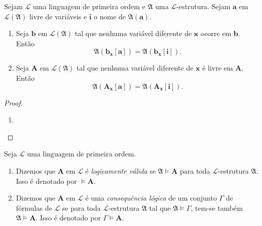 \begin{lemma}
    Sejam $\mathcal{L}$ uma linguagem de primeira ordem e $\mathfrak{A}$ uma $\mathcal{L}$-estrutura. Sejam $\mathbf{a}$ em $\mathcal{L}(\mathfrak{A})$ livre de variáveis e $\mathbf{i}$ o nome de $\mathfrak{A}(\mathbf{a})$.
        \begin{enumerate}[leftmargin=*, align=left, label=\textbf{(\alph*)}]
            \item Seja $\mathbf{b}$ em $\mathcal{L}(\mathfrak{A})$ tal que nenhuma variável diferente de $\mathbf{x}$ ocorre em $\mathbf{b}$. Então
                \[
                    \mathfrak{A}(\mathbf{b}_{\mathbf{x}}[\mathbf{a}]) = \mathfrak{A}(\mathbf{b}_{\mathbf{x}}[\mathbf{i}]).
                \]
            \item Seja $\mathbf{A}$ em $\mathcal{L}(\mathfrak{A})$ tal que nenhuma variável diferente de $\mathbf{x}$ é livre em $\mathbf{A}$. Então
                \[
                    \mathfrak{A}(\mathbf{A}_{\mathbf{x}}[\mathbf{a}]) = \mathfrak{A}(\mathbf{A}_{\mathbf{x}}[\mathbf{i}]).
                \]
        \end{enumerate}
\end{lemma}

\begin{proof}
    \leavevmode
        \begin{enumerate}[leftmargin=*, align=left, label=\textbf{(\alph*)}]
            \item 
        \end{enumerate}
\end{proof}

\begin{definition}
    Seja $\mathcal{L}$ uma linguagem de primeira ordem.
        \begin{enumerate}[leftmargin=*, align=left, label=\textbf{(\alph*)}]
            \item Dizemos que $\mathbf{A}$ em $\mathcal{L}$ é \emph{logicamente válida} se $\mathfrak{A} \vDash \mathbf{A}$ para toda $\mathcal{L}$-estrutura $\mathfrak{A}$. Isso é denotado por $\vDash \mathbf{A}$.
            \item Dizemos que $\mathbf{A}$ em $\mathcal{L}$ é uma \emph{consequência lógica} de um conjunto $\Gamma$ de fórmulas de $\mathcal{L}$ se para toda $\mathcal{L}$-estrutura $\mathfrak{A}$ tal que $\mathfrak{A} \vDash \Gamma$, tem-se também $\mathfrak{A} \vDash \mathbf{A}$. Isso é denotado por $\Gamma \vDash \mathbf{A}$.
        \end{enumerate}
\end{definition}

